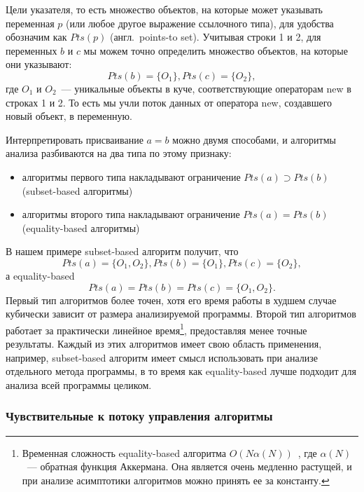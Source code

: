 \documentclass[14pt,titlepage]{extarticle}
\newcommand{\eng}[1]{{\English#1}}
\newcommand{\engdef}[1]{(англ.~\eng{#1})}
\begin{document}
        Цели указателя, то есть множество объектов, на которые может указывать
        переменная $p$ (или любое другое выражение ссылочного типа), для
        удобства обозначим как $Pts(p)$ \engdef{points-to set}.
        Учитывая строки 1 и 2, для переменных $b$ и $c$ мы можем точно
        определить множество объектов, на которые они указывают:
        \[Pts(b) = \{O_1\}, Pts(c) = \{O_2\},\]
        где $O_1$ и $O_2$~--- уникальные объекты в куче, соответствующие
        операторам \eng{new} в строках 1 и 2.  То есть мы учли поток данных от
        оператора \eng{new}, создавшего новый объект, в переменную.

        Интерпретировать присваивание $a = b$ можно двумя способами,
        и алгоритмы анализа разбиваются на два типа по этому признаку:
        \begin{itemize}
          \item алгоритмы первого типа накладывают ограничение
                $Pts(a) \supset Pts(b)$
                (\eng{subset-based} алгоритмы)~\cite{andersen}
          \item алгоритмы второго типа накладывают ограничение
                $Pts(a) = Pts(b)$
                (\eng{equality-based} алгоритмы)~\cite{steensgaard}
        \end{itemize}
        В нашем примере \eng{subset-based} алгоритм получит, что
        \[Pts(a) = \{O_1, O_2\}, Pts(b) = \{O_1\}, Pts(c) = \{O_2\},\]
        а \eng{equality-based}
        \[Pts(a) = Pts(b) = Pts(c) = \{O_1, O_2\}.\]
        Первый тип алгоритмов более точен, хотя его время работы в худшем
        случае кубически зависит от размера анализируемой программы.
        Второй тип алгоритмов работает за практически линейное время\footnote{
          Временная сложность \eng{equality-based} алгоритма
          $O(N \alpha(N))$~\cite{steensgaard}, где $\alpha(N)$~--- обратная
          функция Аккермана. Она является очень медленно растущей, и при
          анализе асимптотики алгоритмов можно принять ее за константу.
        },
        предоставляя менее точные результаты.
        Каждый из этих алгоритмов имеет свою область применения, например,
        \eng{subset-based} алгоритм имеет смысл использовать при анализе
        отдельного метода программы, в то время как \eng{equality-based} лучше
        подходит для анализа всей программы целиком.


      \subsubsection{Чувствительные к потоку управления алгоритмы}
        \label{section:analysis_classification_control_flow}
\end{document}

